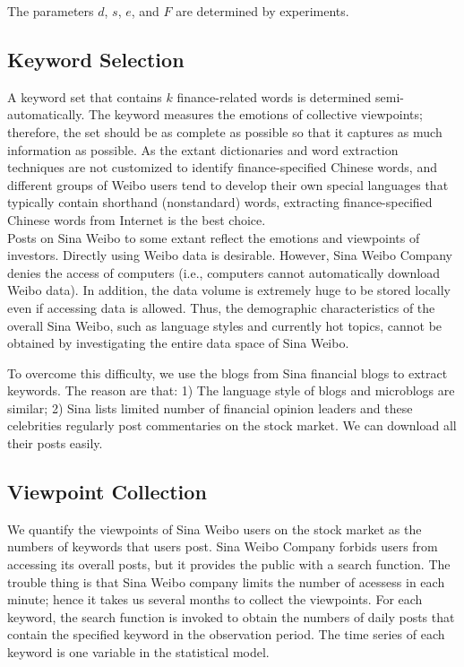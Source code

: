 \documentclass[review,3p,times,12pt,number]{elsarticle}
\begin{document}
The parameters $d$, $s$, $e$, and $F$ are determined by experiments.

\subsection{Keyword Selection}
\label{sec:keysel}
A keyword set that contains $k$ finance-related words is determined semi-automatically. The keyword measures the emotions of collective viewpoints; therefore, the set should be as complete as possible so that it captures as much information as possible. As the extant dictionaries and word extraction techniques are not customized to identify finance-specified Chinese words, and different groups of Weibo users tend to develop their own special languages that typically contain shorthand (nonstandard) words, extracting finance-specified Chinese words from Internet is the best choice.\\
\indent
Posts on Sina Weibo to some extant reflect the emotions and viewpoints of investors. Directly using Weibo data is desirable. However, Sina Weibo Company denies the access of computers (i.e., computers cannot automatically download Weibo data). In addition, the data volume is extremely huge to be stored locally even if accessing data is allowed. Thus, the demographic characteristics of the overall Sina Weibo, such as language styles and currently hot topics, cannot be obtained by investigating the entire data space of Sina Weibo.

\indent
To overcome this difficulty, we use the blogs from Sina financial blogs to extract keywords. The reason are that: 1) The language style of blogs and microblogs are similar; 2) Sina lists limited number of financial opinion leaders and these celebrities regularly post commentaries on the stock market. We can download all their posts easily.\\

\subsection{Viewpoint Collection}
We quantify the viewpoints of Sina Weibo users on the stock market as the numbers of keywords that users post.
Sina Weibo Company forbids users from accessing its overall posts, but it provides the public with a search function. The trouble thing is that Sina Weibo company limits the number of acessess in each minute; hence it takes us several months to collect the viewpoints.
For each keyword, the search function is invoked to obtain the numbers of daily posts that contain the specified keyword in the observation period. The time series of each keyword is one variable in the statistical model.
\end{document}
